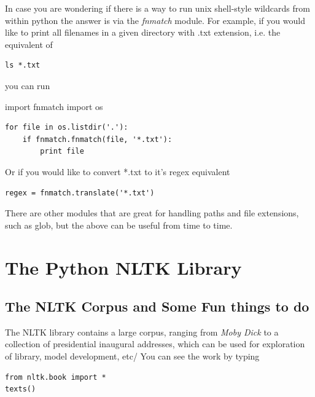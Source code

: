 \begin{digression*}[fnmatch]

    In case you are wondering if there is a way to run unix shell-style wildcards from within python the answer is via the \textit{fnmatch} module. 
    For example, if you would like to print all filenames in a given directory with .txt extension, i.e. the equivalent of 

\begin{verbatim}
ls *.txt
\end{verbatim}

you can run

import fnmatch
import os

\begin{verbatim}
for file in os.listdir('.'):
    if fnmatch.fnmatch(file, '*.txt'):
        print file
\end{verbatim}

Or if you would like to convert *.txt to it's regex equivalent

\begin{verbatim}
regex = fnmatch.translate('*.txt')
\end{verbatim}

There are other modules that are great for handling paths and file extensions, such as glob, but the above can be useful from time to time. 


\end{digression*}




\section{The Python NLTK Library}
\label{nltk}

\subsection{The NLTK Corpus and Some Fun things to do}
\label{sub:nltk_corpus}

The NLTK library contains a large corpus, ranging from \textit{Moby Dick} to a collection of presidential inaugural addresses, which can be used for exploration of library, model development, etc/ 
You can see the work by typing 

\begin{verbatim}
from nltk.book import *
texts()
\end{verbatim}


